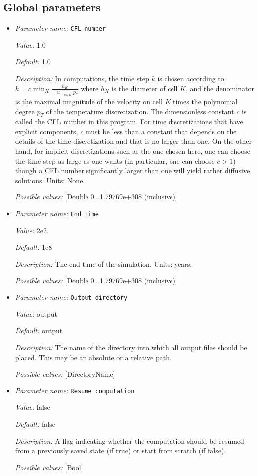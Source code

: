 \subsection{Global parameters}

\begin{itemize}
\item {\it Parameter name:} {\tt CFL number}


{\it Value:} 1.0


{\it Default:} 1.0


{\it Description:} In computations, the time step $k$ is chosen according to $k = c \min_K \frac{h_K}{\|u\|_{\infty,K} p_T}$ where $h_K$ is the diameter of cell $K$, and the denominator is the maximal magnitude of the velocity on cell $K$ times the polynomial degree $p_T$ of the temperature discretization. The dimensionless constant $c$ is called the CFL number in this program. For time discretizations that have explicit components, $c$ must be less than a constant that depends on the details of the time discretization and that is no larger than one. On the other hand, for implicit discretizations such as the one chosen here, one can choose the time step as large as one wants (in particular, one can choose $c>1$) though a CFL number significantly larger than one will yield rather diffusive solutions. Units: None.


{\it Possible values:} [Double 0...1.79769e+308 (inclusive)]
\item {\it Parameter name:} {\tt End time}


{\it Value:} 2e2


{\it Default:} 1e8


{\it Description:} The end time of the simulation. Units: years.


{\it Possible values:} [Double 0...1.79769e+308 (inclusive)]
\item {\it Parameter name:} {\tt Output directory}


{\it Value:} output


{\it Default:} output


{\it Description:} The name of the directory into which all output files should be placed. This may be an absolute or a relative path.


{\it Possible values:} [DirectoryName]
\item {\it Parameter name:} {\tt Resume computation}


{\it Value:} false


{\it Default:} false


{\it Description:} A flag indicating whether the computation should be resumed from a previously saved state (if true) or start from scratch (if false).


{\it Possible values:} [Bool]
\end{itemize}



